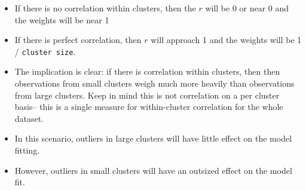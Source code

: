 \documentclass[
]{article}
\providecommand{\tightlist}{%
  \setlength{\itemsep}{0pt}\setlength{\parskip}{0pt}}
\begin{document}
\begin{itemize}
\tightlist
\item
  If there is no correlation within clusters, then the \(r\) will be 0
  or near 0 and the weights will be near 1
\item
  If there is perfect correlation, then \(r\) will approach 1 and the
  weights will be 1 / \texttt{cluster\ size}.
\item
  The implication is clear: if there is correlation within clusters,
  then then observations from small clusters weigh much more heavily
  than observations from large clusters. Keep in mind this is not
  correlation on a per cluster basis-- this is a single measure for
  within-cluster correlation for the whole dataset.
\item
  In this scenario, outliers in large clusters will have little effect
  on the model fitting.
\item
  However, outliers in small clusters will have an outsized effect on
  the model fit.
\end{itemize}
\end{document}

